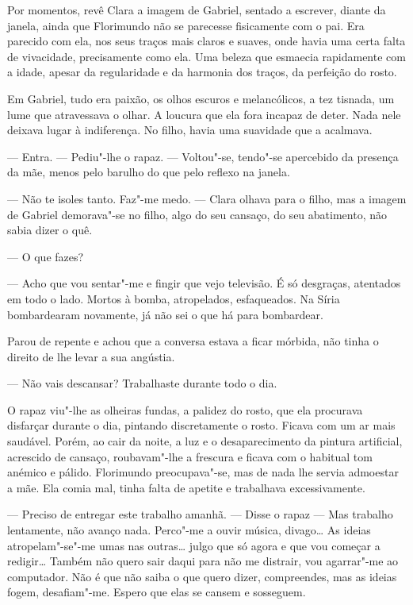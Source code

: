 Por momentos, revê Clara a imagem de Gabriel, sentado a escrever, diante
da janela, ainda que Florimundo não se parecesse fisicamente com o pai.
Era parecido com ela, nos seus traços mais claros e suaves, onde havia
uma certa falta de vivacidade, precisamente como ela. Uma beleza que
esmaecia rapidamente com a idade, apesar da regularidade e da harmonia
dos traços, da perfeição do rosto.

Em Gabriel, tudo era paixão, os olhos escuros e melancólicos, a tez
tisnada, um lume que atravessava o olhar. A loucura que ela fora incapaz
de deter. Nada nele deixava lugar à indiferença. No filho, havia uma
suavidade que a acalmava.

--- Entra. --- Pediu"-lhe o rapaz. --- Voltou"-se, tendo"-se apercebido da
presença da mãe, menos pelo barulho do que pelo reflexo na janela.

--- Não te isoles tanto. Faz"-me medo. --- Clara olhava para o filho, mas a
imagem de Gabriel demorava"-se no filho, algo do seu cansaço, do seu
abatimento, não sabia dizer o quê.

--- O que fazes?

--- Acho que vou sentar"-me e fingir que vejo televisão. É só desgraças,
atentados em todo o lado. Mortos à bomba, atropelados, esfaqueados. Na
Síria bombardearam novamente, já não sei o que há para bombardear.

Parou de repente e achou que a conversa estava a ficar mórbida, não
tinha o direito de lhe levar a sua angústia.

--- Não vais descansar? Trabalhaste durante todo o dia.

O rapaz viu"-lhe as olheiras fundas, a palidez do rosto, que ela
procurava disfarçar durante o dia, pintando discretamente o rosto.
Ficava com um ar mais saudável. Porém, ao cair da noite, a luz e o
desaparecimento da pintura artificial, acrescido de cansaço,
roubavam"-lhe a frescura e ficava com o habitual tom anémico e pálido.
Florimundo preocupava"-se, mas de nada lhe servia admoestar a mãe. Ela
comia mal, tinha falta de apetite e trabalhava excessivamente.

--- Preciso de entregar este trabalho amanhã. ---  Disse o rapaz --- Mas
trabalho lentamente, não avanço nada. Perco"-me a ouvir música, divago\ldots{}
As ideias atropelam"-se"-me umas nas outras\ldots{} julgo que só agora e que
vou começar a redigir\ldots{} Também não quero sair daqui para não me
distrair, vou agarrar"-me ao computador. Não é que não saiba o que quero
dizer, compreendes, mas as ideias fogem, desafiam"-me. Espero que elas se
cansem e sosseguem.


